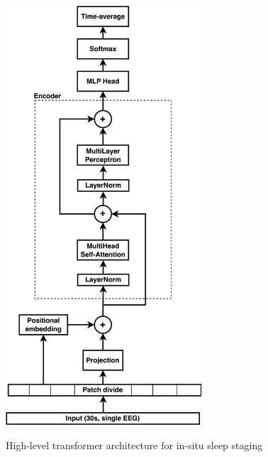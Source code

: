 \begin{figure}
    \centering
    \caption{High-level transformer architecture for in-situ sleep staging}
    \includegraphics[width=0.65\textwidth]{assets/vit.png}
    \label{fig:vit}
\end{figure}

